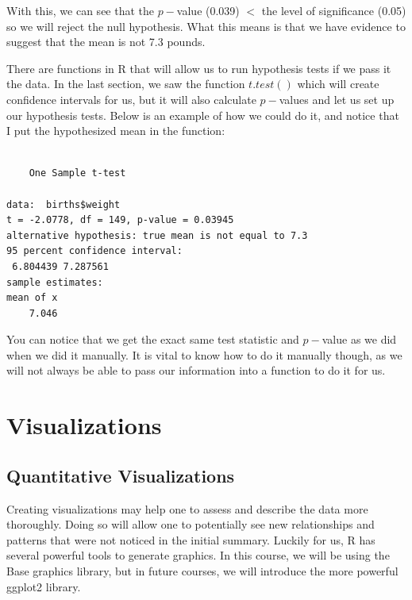 \documentclass[
  letterpaper,
  DIV=11,
  numbers=noendperiod]{scrreprt}
\newenvironment{Shaded}{\begin{snugshade}}{\end{snugshade}}
\newcommand{\AttributeTok}[1]{\textcolor[rgb]{0.40,0.45,0.13}{#1}}
\newcommand{\FloatTok}[1]{\textcolor[rgb]{0.68,0.00,0.00}{#1}}
\newcommand{\FunctionTok}[1]{\textcolor[rgb]{0.28,0.35,0.67}{#1}}
\newcommand{\NormalTok}[1]{\textcolor[rgb]{0.00,0.23,0.31}{#1}}
\newcommand{\SpecialCharTok}[1]{\textcolor[rgb]{0.37,0.37,0.37}{#1}}
\begin{document}
With this, we can see that the \(p-\)value (0.039) \(<\) the level of
significance (0.05) so we will reject the null hypothesis. What this
means is that we have evidence to suggest that the mean is not 7.3
pounds.

There are functions in R that will allow us to run hypothesis tests if
we pass it the data. In the last section, we saw the function
\(t.test()\) which will create confidence intervals for us, but it will
also calculate \(p-\)values and let us set up our hypothesis tests.
Below is an example of how we could do it, and notice that I put the
hypothesized mean in the function:

\begin{Shaded}
\end{Shaded}

\begin{verbatim}

    One Sample t-test

data:  births$weight
t = -2.0778, df = 149, p-value = 0.03945
alternative hypothesis: true mean is not equal to 7.3
95 percent confidence interval:
 6.804439 7.287561
sample estimates:
mean of x 
    7.046 
\end{verbatim}

You can notice that we get the exact same test statistic and \(p-\)value
as we did when we did it manually. It is vital to know how to do it
manually though, as we will not always be able to pass our information
into a function to do it for us.


\chapter{Visualizations}\label{visualizations}

\section{Quantitative Visualizations}\label{quantitative-visualizations}

Creating visualizations may help one to assess and describe the data
more thoroughly. Doing so will allow one to potentially see new
relationships and patterns that were not noticed in the initial summary.
Luckily for us, R has several powerful tools to generate graphics. In
this course, we will be using the Base graphics library, but in future
courses, we will introduce the more powerful ggplot2 library.
\end{document}
